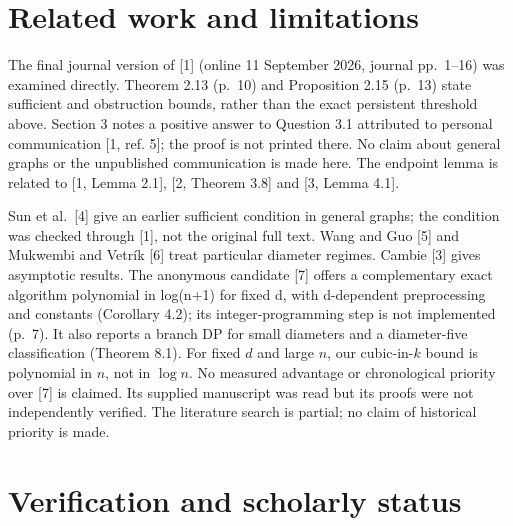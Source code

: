 \documentclass[
  10pt,
  a4paper,
]{article}
\begin{document}
\section{Related work and
limitations}\label{related-work-and-limitations}

The final journal version of {[}1{]} (online 11 September 2026, journal
pp.~1--16) was examined directly. Theorem 2.13 (p.~10) and Proposition
2.15 (p.~13) state sufficient and obstruction bounds, rather than the
exact persistent threshold above. Section 3 notes a positive answer to
Question 3.1 attributed to personal communication {[}1, ref. 5{]}; the
proof is not printed there. No claim about general graphs or the
unpublished communication is made here. The endpoint lemma is related to
{[}1, Lemma 2.1{]}, {[}2, Theorem 3.8{]} and {[}3, Lemma 4.1{]}.

Sun et al.~{[}4{]} give an earlier sufficient condition in general
graphs; the condition was checked through {[}1{]}, not the original full
text. Wang and Guo {[}5{]} and Mukwembi and Vetrík {[}6{]} treat
particular diameter regimes. Cambie {[}3{]} gives asymptotic results.
The anonymous candidate {[}7{]} offers a complementary exact algorithm
polynomial in log(n+1) for fixed d, with d-dependent preprocessing and
constants (Corollary 4.2); its integer-programming step is not
implemented (p.~7). It also reports a branch DP for small diameters and
a diameter-five classification (Theorem 8.1). For fixed \(d\) and large
\(n\), our cubic-in-\(k\) bound is polynomial in \(n\), not in
\(\log n\). No measured advantage or chronological priority over {[}7{]}
is claimed. Its supplied manuscript was read but its proofs were not
independently verified. The literature search is partial; no claim of
historical priority is made.

\section{Verification and scholarly
status}\label{verification-and-scholarly-status}
\end{document}
